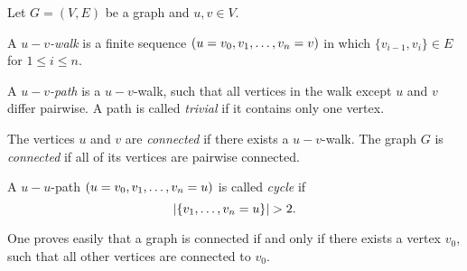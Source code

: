 \begin{defin}
Let $G=(V,E)$ be a graph and $u,v\in V$.
\begin{thmlist}
\item A \emph{$u-v$-walk} is a finite sequence $(u=v_0,v_{1},\ldots,v_{n}=v)$ in which $\lbrace v_{i-1},v_i\rbrace\in E$ for $1\leq i\leq n$.
\item A \emph{$u-v$-path} is a $u-v$-walk, such that all vertices in the walk except $u$ and $v$ differ pairwise. A path is called \emph{trivial} if it contains only one vertex.
\item The vertices $u$ and $v$ are \textit{connected} if there exists a $u-v$-walk. The graph $G$ is \emph{connected} if all of its vertices are pairwise connected.
\item A $u-u$-path $(u=v_0,v_{1},\ldots,v_{n}=u)$ is called \emph{cycle} if 
\[|\lbrace\seq{v}=u\rbrace|>2.\]
\end{thmlist}
\end{defin}

\begin{rem}
One proves easily that a graph is connected if and only if there exists a vertex $v_0$, such that all other vertices are connected to $v_0$.
\end{rem}

